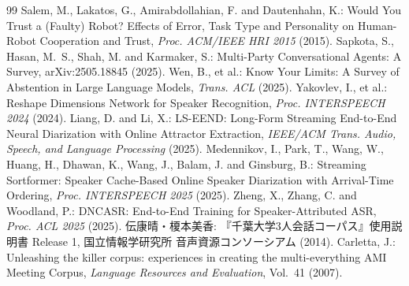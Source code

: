 \documentclass[a4paper]{ltjsarticle}
\begin{document}
\begin{thebibliography}{99}
 Salem, M., Lakatos, G., Amirabdollahian, F. and Dautenhahn, K.:
Would You Trust a (Faulty) Robot? Effects of Error, Task Type and Personality on Human-Robot Cooperation and Trust,
\textit{Proc. ACM/IEEE HRI 2015} (2015).
 Sapkota, S., Hasan, M.~S., Shah, M. and Karmaker, S.:
Multi-Party Conversational Agents: A Survey,
arXiv:2505.18845 (2025).
 Wen, B., et al.:
Know Your Limits: A Survey of Abstention in Large Language Models,
\textit{Trans. ACL} (2025).
 Yakovlev, I., et al.:
Reshape Dimensions Network for Speaker Recognition,
\textit{Proc. INTERSPEECH 2024} (2024).
 Liang, D. and Li, X.:
LS-EEND: Long-Form Streaming End-to-End Neural Diarization with Online Attractor Extraction,
\textit{IEEE/ACM Trans. Audio, Speech, and Language Processing} (2025).
 Medennikov, I., Park, T., Wang, W., Huang, H., Dhawan, K., Wang, J., Balam, J. and Ginsburg, B.:
Streaming Sortformer: Speaker Cache-Based Online Speaker Diarization with Arrival-Time Ordering,
\textit{Proc. INTERSPEECH 2025} (2025).
 Zheng, X., Zhang, C. and Woodland, P.:
DNCASR: End-to-End Training for Speaker-Attributed ASR,
\textit{Proc. ACL 2025} (2025).
 伝康晴・榎本美香:
『千葉大学3人会話コーパス』使用説明書 Release 1,
国立情報学研究所 音声資源コンソーシアム (2014).
 Carletta, J.:
Unleashing the killer corpus: experiences in creating the multi-everything AMI Meeting Corpus,
\textit{Language Resources and Evaluation}, Vol.~41 (2007).
\end{thebibliography}
\end{document}
